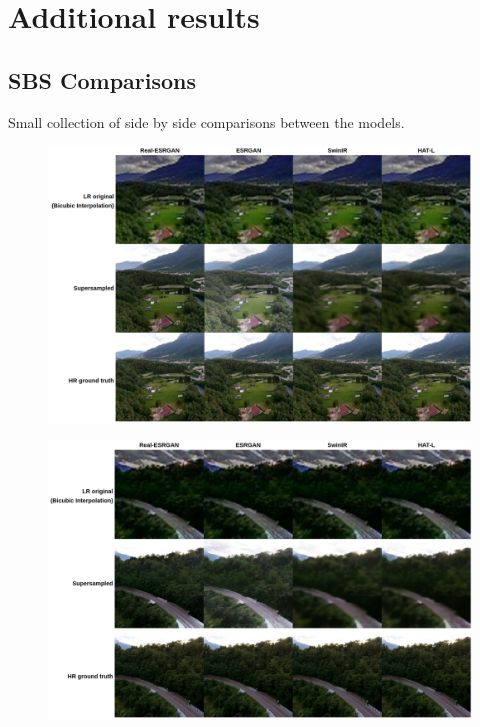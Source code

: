 \chapter{Additional results}

\section{SBS Comparisons}

Small collection of side by side comparisons between the models.
\begin{figure}[H]
  \includegraphics[scale=0.3]{figures/allegati/sbs_1.png}
  \label{img:sbs1}
\end{figure}
\begin{figure}[H]
  \includegraphics[scale=0.3]{figures/allegati/sbs_2.png}
  \label{img:sbs2}
\end{figure}
